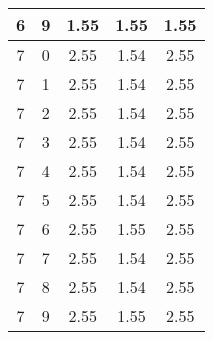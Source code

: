 \begin{longtable}{|c|c||c||c||c|}
	6 & 9 & 1.55 & 1.55 & 1.55 \\ \hline
	7 & 0 & 2.55 & 1.54 & 2.55 \\ \hline
	7 & 1 & 2.55 & 1.54 & 2.55 \\ \hline
	7 & 2 & 2.55 & 1.54 & 2.55 \\ \hline
	7 & 3 & 2.55 & 1.54 & 2.55 \\ \hline
	7 & 4 & 2.55 & 1.54 & 2.55 \\ \hline
	7 & 5 & 2.55 & 1.54 & 2.55 \\ \hline
	7 & 6 & 2.55 & 1.55 & 2.55 \\ \hline
	7 & 7 & 2.55 & 1.54 & 2.55 \\ \hline
	7 & 8 & 2.55 & 1.54 & 2.55 \\ \hline
	7 & 9 & 2.55 & 1.55 & 2.55 \\ \hline
\end{longtable}
\clearpage{}
